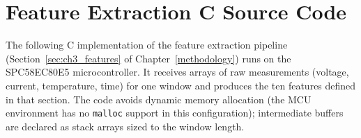 
\chapter{Feature Extraction C Source Code}
\label{app:feature_extraction}

The following C implementation of the feature extraction pipeline (Section~\ref{sec:ch3_features} of Chapter~\ref{methodology}) runs on the SPC58EC80E5 microcontroller. It receives arrays of raw measurements (voltage, current, temperature, time) for one window and produces the ten features defined in that section. The code avoids dynamic memory allocation (the MCU environment has no \texttt{malloc} support in this configuration); intermediate buffers are declared as stack arrays sized to the window length.

